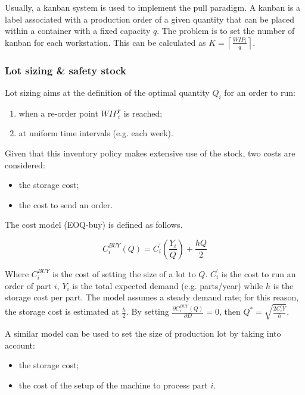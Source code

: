 Usually, a kanban system is used to implement the pull paradigm. A kanban is a label associated with a production order of a given quantity that can be placed within a container with a fixed capacity $q$. The problem is to set the number of kanban for each workstation. This can be calculated as $K=\left\lceil\frac{WIP_i}{q}\right\rceil$.

\subsubsection{Lot sizing \& safety stock}
Lot sizing aims at the definition of the optimal quantity $Q_i$ for an order to run:
\begin{enumerate}
    \item when a re-order point $WIP_i^r$ is reached;
	\item at uniform time intervals (e.g. each week).

\end{enumerate}

Given that this inventory policy makes extensive use of the stock, two costs are considered:

\begin{itemize}
    \item the storage cost;
    \item the cost to send an order.

\end{itemize}

The cost model (EOQ-buy) is defined as follows.

\begin{equation}
    C_i^{BUY}\left(Q\right)=C_i^\prime\left(\frac{Y_i}{Q}\right)+\frac{hQ}{2}
\end{equation}

Where $C_i^{BUY}$ is the cost of setting the size of a lot to $Q$. $C_i^\prime$ is the cost to run an order of part $i$, $Y_i$ is the total expected demand (e.g. parts/year) while $h$ is the storage cost per part. The model assumes a steady demand rate; for this reason, the storage cost is estimated at $\frac{h}{2}$. By setting $\frac{\partial C_i^{BUY}(Q)}{\partial D}=0$, then $Q^\ast=\sqrt{\frac{2C_i^\prime Y}{h}}$.\par

A similar model can be used to set the size of production lot by taking into account:
\begin{itemize}
    \item the storage cost;
    \item the cost of the setup of the machine to process part $i$.

\end{itemize}

